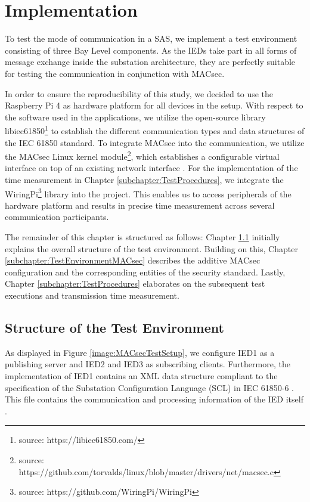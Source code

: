 \documentclass[conference, onecolumn, a4paper]{IEEEtran}
\begin{document}
\section{Implementation}
\label{chapter:implementation}
\noindent To test the mode of communication in a SAS, we implement a test environment consisting of three Bay Level components. As the IEDs take part 
in all forms of message exchange inside the substation architecture, they are perfectly suitable for testing the communication in conjunction with MACsec. 

\smallskip
In order to ensure the reproducibility of this study, we decided to use the Raspberry Pi 4 as hardware platform for all devices in the setup. With respect 
to the software used in the applications, we utilize the open-source library libiec61850\footnote{source: https://libiec61850.com/} to establish the 
different communication types and data structures of the IEC 61850 standard. To integrate MACsec into the communication, we utilize the MACsec Linux kernel 
module\footnote{source: https://github.com/torvalds/linux/blob/master/drivers/net/macsec.c}, which establishes a configurable virtual interface on top of 
an existing network interface \cite{MACsecLinuxModuleDoc:2016}. For the implementation of the time measurement in Chapter \ref{subchapter:TestProcedures},  
we integrate the WiringPi\footnote{source: https://github.com/WiringPi/WiringPi} library into the project. This enables us to access peripherals of the 
hardware platform and results in precise time measurement across several communication participants. 

\smallskip 
The remainder of this chapter is structured as follows: Chapter \ref{subchapter:TestEnvironmentStructure} initially explains the overall structure of the 
test environment. Building on this, Chapter \ref{subchapter:TestEnvironmentMACsec} describes the additive MACsec configuration and the corresponding entities 
of the security standard. Lastly, Chapter \ref{subchapter:TestProcedures} elaborates on the subsequent test executions and transmission time measurement. 

\subsection{Structure of the Test Environment}
\label{subchapter:TestEnvironmentStructure}
\noindent As displayed in Figure \ref{image:MACsecTestSetup}, we configure IED1 as a publishing server and IED2 and IED3 as subscribing clients. 
Furthermore, the implementation of IED1 contains an XML data structure compliant to the specification of the Substation Configuration Language (SCL) 
in IEC 61850-6 \cite{IEC61850-6:2010}. This file contains the communication and processing information of the IED itself \cite{IEC61850_Overview:2006}.
\end{document}
